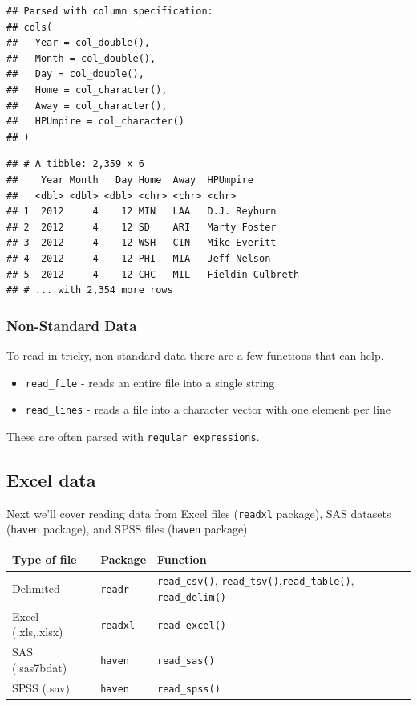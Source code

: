 \documentclass[
]{book}
\theoremstyle{definition}
\theoremstyle{definition}
\theoremstyle{definition}
\theoremstyle{remark}
\begin{document}
\begin{verbatim}
## Parsed with column specification:
## cols(
##   Year = col_double(),
##   Month = col_double(),
##   Day = col_double(),
##   Home = col_character(),
##   Away = col_character(),
##   HPUmpire = col_character()
## )
\end{verbatim}

\begin{verbatim}
## # A tibble: 2,359 x 6
##    Year Month   Day Home  Away  HPUmpire        
##   <dbl> <dbl> <dbl> <chr> <chr> <chr>           
## 1  2012     4    12 MIN   LAA   D.J. Reyburn    
## 2  2012     4    12 SD    ARI   Marty Foster    
## 3  2012     4    12 WSH   CIN   Mike Everitt    
## 4  2012     4    12 PHI   MIA   Jeff Nelson     
## 5  2012     4    12 CHC   MIL   Fieldin Culbreth
## # ... with 2,354 more rows
\end{verbatim}

\hypertarget{non-standard-data}{%
\subsubsection{Non-Standard Data}\label{non-standard-data}}

To read in tricky, non-standard data there are a few functions that can help.

\begin{itemize}
\item
  \texttt{read\_file} - reads an entire file into a single string
\item
  \texttt{read\_lines} - reads a file into a character vector with one element per line
\end{itemize}

These are often parsed with \texttt{regular\ expressions}.

\hypertarget{excel-data}{%
\subsection{Excel data}\label{excel-data}}

Next we'll cover reading data from Excel files (\texttt{readxl} package), SAS datasets (\texttt{haven} package), and SPSS files (\texttt{haven} package).

\begin{longtable}[]{@{}lll@{}}
\toprule
Type of file & Package & Function\tabularnewline
\midrule
\endhead
Delimited & \texttt{readr} & \texttt{read\_csv()}, \texttt{read\_tsv()},\texttt{read\_table()}, \texttt{read\_delim()}\tabularnewline
Excel (.xls,.xlsx) & \texttt{readxl} & \texttt{read\_excel()}\tabularnewline
SAS (.sas7bdat) & \texttt{haven} & \texttt{read\_sas()}\tabularnewline
SPSS (.sav) & \texttt{haven} & \texttt{read\_spss()}\tabularnewline
\bottomrule
\end{longtable}
\end{document}
